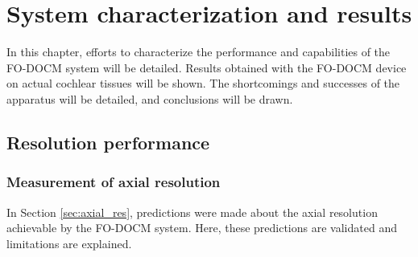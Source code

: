\chapter{System characterization and results}

In this chapter, efforts to characterize the performance and capabilities of the FO-DOCM system will be detailed. Results obtained with the FO-DOCM device on actual cochlear tissues will be shown. The shortcomings and successes of the apparatus will be detailed, and conclusions will be drawn.

\section{Resolution performance}

\subsection{Measurement of axial resolution}

In Section \ref{sec:axial_res}, predictions were made about the axial resolution achievable by the FO-DOCM system. Here, these predictions are validated and limitations are explained.





